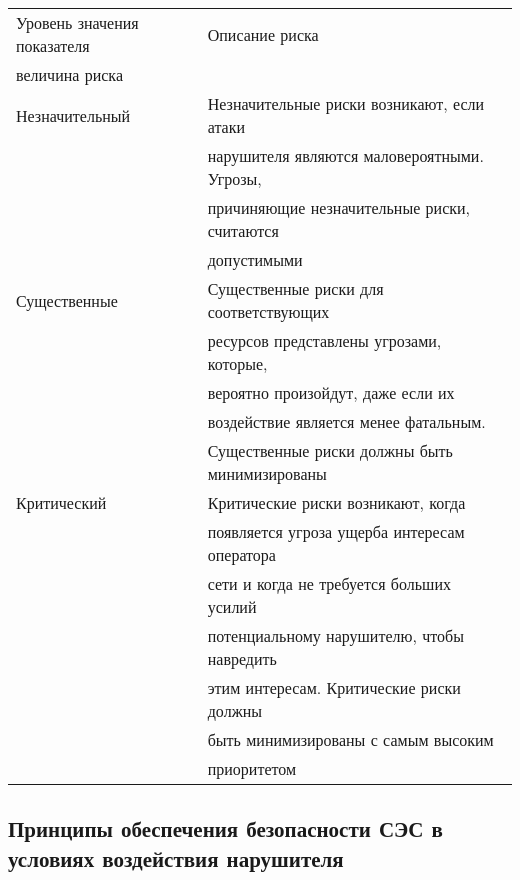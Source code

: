 \documentclass[12pt, russian, oneside, article]{ncc}
\begin{document}
\begin{center}
\begin{tabular}{ll}
 Уровень значения показателя  &  Описание риска                                 \\
 величина риска               &                                                 \\
\hline
 Незначительный               &  Незначительные риски возникают, если атаки     \\
                              &  нарушителя являются маловероятными. Угрозы,    \\
                              &  причиняющие незначительные риски, считаются    \\
                              &  допустимыми                                    \\
\hline
 Существенные                 &  Существенные риски для соответствующих         \\
                              &  ресурсов представлены угрозами, которые,       \\
                              &  вероятно произойдут, даже если их              \\
                              &  воздействие является менее фатальным.          \\
                              &  Существенные риски должны быть минимизированы  \\
\hline
 Критический                  &  Критические риски возникают, когда             \\
                              &  появляется угроза ущерба интересам оператора   \\
                              &  сети и когда не требуется больших усилий       \\
                              &  потенциальному нарушителю, чтобы навредить     \\
                              &  этим интересам. Критические риски должны       \\
                              &  быть минимизированы с самым высоким            \\
                              &  приоритетом                                    \\
\end{tabular}
\end{center}
\subsection{Принципы обеспечения безопасности СЭС в условиях воздействия нарушителя}
\label{sec-1_4}
\end{document}
